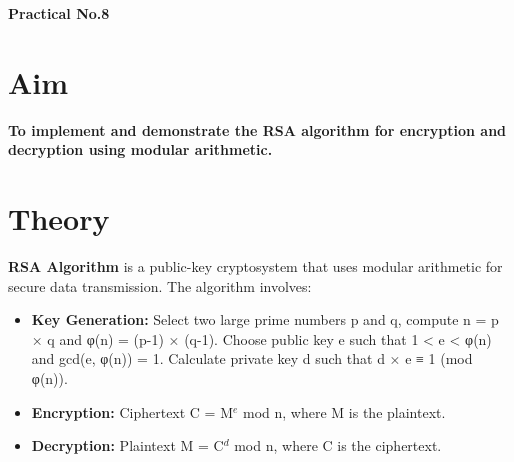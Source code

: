 \documentclass[a4paper,12pt]{article}
\begin{document}
\begin{center}
    \Large\textbf{Practical No.8}
\end{center}

\section*{Aim}
\large\textbf{To implement and demonstrate the RSA algorithm for encryption and decryption using modular arithmetic.}
\normalsize

\section*{Theory}
\textbf{RSA Algorithm} is a public-key cryptosystem that uses modular arithmetic for secure data transmission. The algorithm involves:
\begin{itemize}
    \item \textbf{Key Generation:} Select two large prime numbers p and q, compute n = p × q and φ(n) = (p-1) × (q-1). Choose public key e such that 1 < e < φ(n) and gcd(e, φ(n)) = 1. Calculate private key d such that d × e ≡ 1 (mod φ(n)).
    \item \textbf{Encryption:} Ciphertext C = M$^e$ mod n, where M is the plaintext.
    \item \textbf{Decryption:} Plaintext M = C$^d$ mod n, where C is the ciphertext.
\end{itemize}

\end{document}
